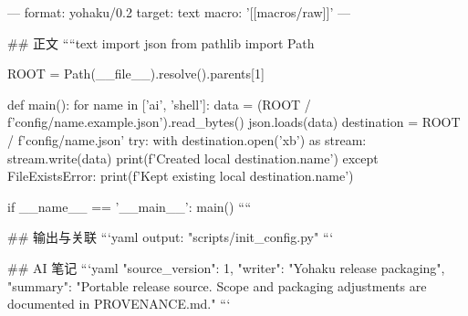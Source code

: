 ---
format: yohaku/0.2
target: text
macro: '[[macros/raw]]'
---

## 正文
````text
import json
from pathlib import Path


ROOT = Path(__file__).resolve().parents[1]


def main():
    for name in ['ai', 'shell']:
        data = (ROOT / f'config/{name}.example.json').read_bytes()
        json.loads(data)
        destination = ROOT / f'config/{name}.json'
        try:
            with destination.open('xb') as stream:
                stream.write(data)
            print(f'Created local {destination.name}')
        except FileExistsError:
            print(f'Kept existing local {destination.name}')


if __name__ == '__main__':
    main()
````

## 输出与关联
```yaml
output: "scripts/init_config.py"
```

## AI 笔记
```yaml
{"source_version": 1, "writer": "Yohaku release packaging", "summary": "Portable release source. Scope and packaging adjustments are documented in PROVENANCE.md."}
```
